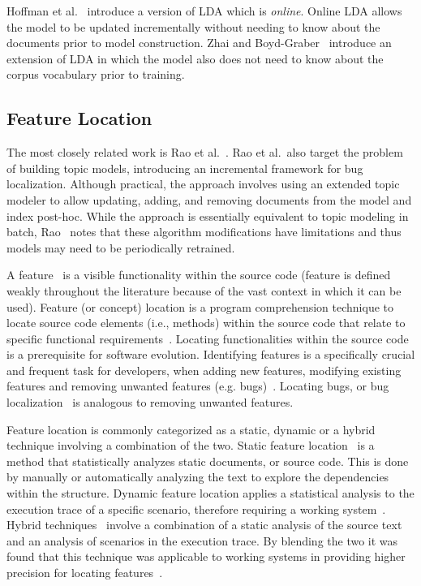 Hoffman et al.~\cite{Hoffman-etal:2010} introduce a version of LDA which is
\emph{online}.  Online LDA allows the model to be updated incrementally without
needing to know about the documents prior to model construction.  Zhai and
Boyd-Graber~\cite{Zhai-Boyd-Graber:2013} introduce an extension of LDA in which
the model also does not need to know about the corpus vocabulary prior to
training.


\subsection{Feature Location}

The most closely related work is Rao et al.~\cite{Rao-etal:2013}. Rao et al.\
also target the problem of building topic models, introducing an incremental
framework for bug localization.  Although practical, the approach involves using
an extended topic modeler to allow updating, adding, and removing documents from
the model and index post-hoc.  While the approach is essentially equivalent to
topic modeling in batch, Rao~\cite{Rao:2013} notes that these algorithm
modifications have limitations and thus models may need to be periodically
retrained.

A feature~\cite{Biggerstaff-etal:1993} is a visible functionality within the
source code (feature is defined weakly throughout the literature because of the
vast context in which it can be used). Feature (or concept) location is
a program comprehension technique to locate source code elements (i.e., methods)
within the source code that relate to specific functional
requirements~\cite{Eisenbarth-etal:2001, Biggers-etal:2014}. Locating
functionalities within the source code is a prerequisite for software evolution.
Identifying features is a specifically crucial and frequent task for developers,
when adding new features, modifying existing features and removing unwanted
features (e.g.  bugs)~\cite{Rajlich-Gosavi:2004, Dit-etal:2013b}. Locating bugs,
or bug localization~\cite{Lukins-etal:2008, Bassett-Kraft:2013} is analogous to
removing unwanted features.

Feature location is commonly categorized as a static, dynamic or a hybrid
technique involving a combination of the two. Static feature
location~\cite{Zhao-etal:2006} is a method that statistically analyzes static
documents, or source code. This is done by manually or automatically analyzing
the text to explore the dependencies within the structure. Dynamic feature
location applies a statistical analysis to the execution trace of a specific
scenario, therefore requiring a working
system~\cite{Eisenbarth-etal:2001,Poshyvanyk-etal:2007}.  Hybrid
techniques~\cite{Eisenbarth-etal:2003, Eaddy-etal:2008, Revelle-etal:2010}
involve a combination of a static analysis of the source text and an analysis of
scenarios in the execution trace. By blending the two it was found that this
technique was applicable to working systems in providing higher precision for
locating features~\cite{Poshyvanyk-etal:2007, Ernst:2004, Revelle-Coppitt:UNK}.

